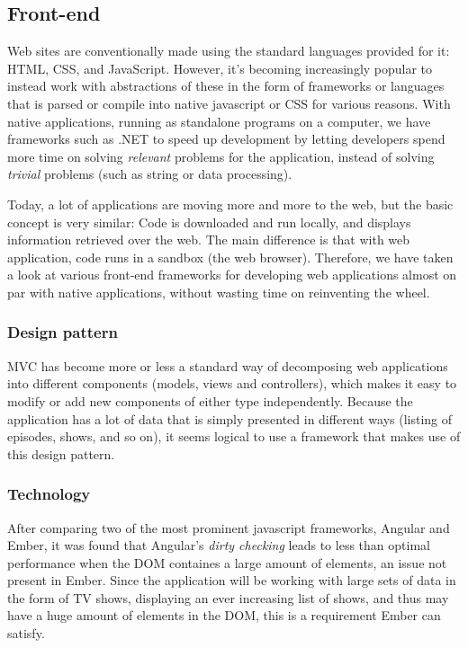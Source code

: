 \subsection{Front-end}
Web sites are conventionally made using the standard languages provided for it: HTML, CSS, and JavaScript. However, it's becoming increasingly popular to instead work with abstractions of these in the form of frameworks or languages that is parsed or compile into native javascript or CSS for various reasons. With native applications, running as standalone programs on a computer, we have frameworks such as .NET to speed up development by letting developers spend more time on solving \textit{relevant} problems for the application, instead of solving \textit{trivial} problems (such as string or data processing).

Today, a lot of applications are moving more and more to the web, but the basic concept is very similar: Code is downloaded and run locally, and displays information retrieved over the web. The main difference is that with web application, code runs in a sandbox (the web browser). Therefore, we have taken a look at various front-end frameworks for developing web applications almost on par with native applications, without wasting time on reinventing the wheel.   

\subsubsection{Design pattern}

MVC has become more or less a standard way of decomposing web applications into different components (models, views and controllers), which makes it easy to modify or add new components of either type independently. Because the application has a lot of data that is simply presented in different ways (listing of episodes, shows, and so on), it seems logical to use a framework that makes use of this design pattern.

\subsubsection{Technology}
After comparing two of the most prominent javascript frameworks, Angular and Ember, it was found that Angular's \textit{dirty checking} leads to less than optimal performance when the DOM containes a large amount of elements, an issue not present in Ember. Since the application will be working with large sets of data in the form of TV shows, displaying an ever increasing list of shows, and thus may have a huge amount of elements in the DOM, this is a requirement Ember can satisfy.

